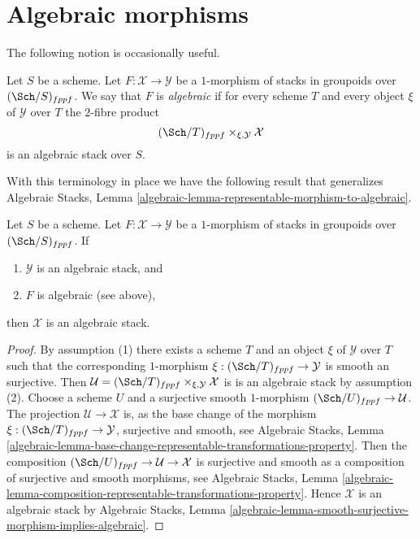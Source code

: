 \section{Algebraic morphisms}
\label{section-algebraic}

\noindent
The following notion is occasionally useful.

\begin{definition}
\label{definition-algebraic}
Let $S$ be a scheme. Let $F : \mathcal{X} \to \mathcal{Y}$ be a
$1$-morphism of stacks in groupoids over $(\Sch/S)_{fppf}$.
We say that $F$ is {\it algebraic} if for every scheme $T$ and every
object $\xi$ of $\mathcal{Y}$ over $T$ the $2$-fibre product
$$
(\Sch/T)_{fppf} \times_{\xi, \mathcal{Y}} \mathcal{X}
$$
is an algebraic stack over $S$.
\end{definition}

\noindent
With this terminology in place we have the following result that generalizes
Algebraic Stacks, Lemma
\ref{algebraic-lemma-representable-morphism-to-algebraic}.

\begin{lemma}
\label{lemma-algebraic-morphism-to-algebraic}
Let $S$ be a scheme.
Let $F : \mathcal{X} \to \mathcal{Y}$ be a $1$-morphism of
stacks in groupoids over $(\Sch/S)_{fppf}$. If
\begin{enumerate}
\item $\mathcal{Y}$ is an algebraic stack, and
\item $F$ is algebraic (see above),
\end{enumerate}
then $\mathcal{X}$ is an algebraic stack.
\end{lemma}

\begin{proof}
By assumption (1) there exists a scheme $T$ and an object
$\xi$ of $\mathcal{Y}$ over $T$ such that the corresponding
$1$-morphism $\xi : (\Sch/T)_{fppf} \to \mathcal{Y}$
is smooth an surjective. Then
$\mathcal{U} = (\Sch/T)_{fppf} \times_{\xi, \mathcal{Y}} \mathcal{X}$
is is an algebraic stack by assumption (2).
Choose a scheme $U$ and a surjective smooth $1$-morphism
$(\Sch/U)_{fppf} \to \mathcal{U}$.
The projection $\mathcal{U} \longrightarrow \mathcal{X}$
is, as the base change of the morphism
$\xi : (\Sch/T)_{fppf} \to \mathcal{Y}$,
surjective and smooth, see
Algebraic Stacks, Lemma
\ref{algebraic-lemma-base-change-representable-transformations-property}.
Then the composition
$(\Sch/U)_{fppf} \to \mathcal{U} \to \mathcal{X}$
is surjective and smooth as a composition of surjective and smooth
morphisms, see
Algebraic Stacks, Lemma
\ref{algebraic-lemma-composition-representable-transformations-property}.
Hence $\mathcal{X}$ is an algebraic stack by
Algebraic Stacks, Lemma
\ref{algebraic-lemma-smooth-surjective-morphism-implies-algebraic}.
\end{proof}

